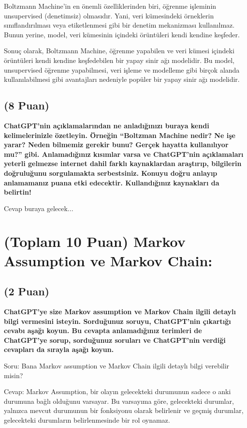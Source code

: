 \documentclass[11pt]{article}
\begin{document}
Boltzmann Machine'in en önemli özelliklerinden biri, öğrenme işleminin unsupervised (denetimsiz) olmasıdır. Yani, veri kümesindeki örneklerin sınıflandırılması veya etiketlenmesi gibi bir denetim mekanizması kullanılmaz. Bunun yerine, model, veri kümesinin içindeki örüntüleri kendi kendine keşfeder.

Sonuç olarak, Boltzmann Machine, öğrenme yapabilen ve veri kümesi içindeki örüntüleri kendi kendine keşfedebilen bir yapay sinir ağı modelidir. Bu model, unsupervised öğrenme yapabilmesi, veri işleme ve modelleme gibi birçok alanda kullanılabilmesi gibi avantajları nedeniyle popüler bir yapay sinir ağı modelidir.

\subsection{(8 Puan)} \textbf{ChatGPT’nin açıklamalarından ne anladığınızı buraya kendi kelimelerinizle özetleyin. Örneğin ``Boltzman Machine nedir? Ne işe yarar? Neden bilmemiz gerekir bunu? Gerçek hayatta kullanılıyor mu?'' gibi. Anlamadığınız kısımlar varsa ve ChatGPT’nin açıklamaları yeterli gelmezse internet dahil farklı kaynaklardan araştırıp, bilgilerin doğruluğunu sorgulamakta serbestsiniz. Konuyu doğru anlayıp anlamamanız puana etki edecektir. Kullandığınız kaynakları da belirtin!}

Cevap buraya gelecek...

\section{(Toplam 10 Puan) Markov Assumption ve Markov Chain:}

\subsection{(2 Puan)} \textbf{ChatGPT’ye size Markov assumption ve Markov Chain ilgili detaylı bilgi vermesini isteyin. Sorduğunuz soruyu, ChatGPT'nin çıkartığı cevabı aşağı koyun. Bu cevapta anlamadığınız terimleri de ChatGPT’ye sorup, sorduğunuz soruları ve ChatGPT’nin verdiği cevapları da sırayla aşağı koyun.}

Soru: Bana Markov assumption ve Markov Chain ilgili detaylı bilgi verebilir misin?

Cevap: Markov Assumption, bir olayın gelecekteki durumunun sadece o anki durumuna bağlı olduğunu varsayar. Bu varsayıma göre, gelecekteki durumlar, yalnızca mevcut durumunun bir fonksiyonu olarak belirlenir ve geçmiş durumlar, gelecekteki durumların belirlenmesinde bir rol oynamaz.
\end{document}
